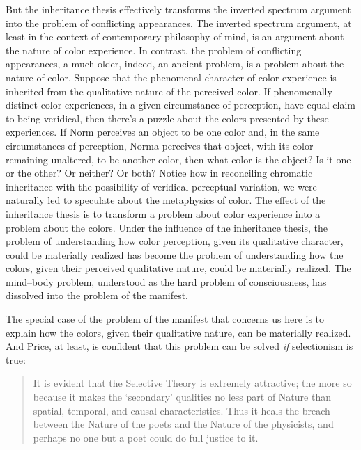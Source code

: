 \documentclass[12pt]{article}
\begin{document}
But the inheritance thesis effectively transforms the inverted spectrum argument into the problem of conflicting appearances. The inverted spectrum argument, at least in the context of contemporary philosophy of mind, is an argument about the nature of color experience. In contrast, the problem of conflicting appearances, a much older, indeed, an ancient problem, is a problem about the nature of color. Suppose that the phenomenal character of color experience is inherited from the qualitative nature of the perceived color. If phenomenally distinct color experiences, in a given circumstance of perception, have equal claim to being veridical, then there's a puzzle about the colors presented by these experiences. If Norm perceives an object to be one color and, in the same circumstances of perception, Norma perceives that object, with its color remaining unaltered, to be another color, then what color is the object? Is it one or the other? Or neither? Or both? Notice how in reconciling chromatic inheritance with the possibility of veridical perceptual variation, we were naturally led to speculate about the metaphysics of color. The effect of the inheritance thesis is to transform a problem about color experience into a problem about the colors. Under the influence of the inheritance thesis, the problem of understanding how color perception, given its qualitative character, could be materially realized has become the problem of understanding how the colors, given their perceived qualitative nature, could be materially realized. The mind--body problem, understood as the hard problem of consciousness, has dissolved into the problem of the manifest. \citep[See][for further relevant discussion.]{Byrne:2005jw,Kalderon:2006tg,Sellars:1963eo,Shoemaker:wk} 

The special case of the problem of the manifest that concerns us here is to explain how the colors, given their qualitative nature, can be materially realized. And Price, at least, is confident that this problem can be solved \emph{if} selectionism is true:
\begin{quote}
    It is evident that the Selective Theory is extremely attractive; the more so because it makes the `secondary' qualities no less part of Nature than spatial, temporal, and causal characteristics. Thus it heals the breach between the Nature of the poets and the Nature of the physicists, and perhaps no one but a poet could do full justice to it. \citep[43]{Price:1932fk}
\end{quote}

 
 
\end{document}
